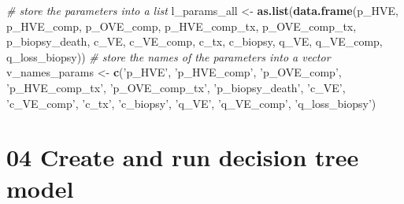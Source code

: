 \documentclass[
]{article}
\newenvironment{Shaded}{\begin{snugshade}}{\end{snugshade}}
\newcommand{\CommentTok}[1]{\textcolor[rgb]{0.56,0.35,0.01}{\textit{#1}}}
\newcommand{\KeywordTok}[1]{\textcolor[rgb]{0.13,0.29,0.53}{\textbf{#1}}}
\newcommand{\NormalTok}[1]{#1}
\newcommand{\StringTok}[1]{\textcolor[rgb]{0.31,0.60,0.02}{#1}}
\begin{document}
\begin{Shaded}
\begin{Highlighting}[]
\CommentTok{# store the parameters into a list}
\NormalTok{l_params_all <-}\StringTok{ }\KeywordTok{as.list}\NormalTok{(}\KeywordTok{data.frame}\NormalTok{(p_HVE, p_HVE_comp, p_OVE_comp, p_HVE_comp_tx, p_OVE_comp_tx, p_biopsy_death, }
\NormalTok{                                   c_VE, c_VE_comp, c_tx, c_biopsy, }
\NormalTok{                                   q_VE, q_VE_comp, q_loss_biopsy))}
\CommentTok{# store the names of the parameters into a vector}
\NormalTok{v_names_params <-}\StringTok{ }\KeywordTok{c}\NormalTok{(}\StringTok{'p_HVE'}\NormalTok{, }\StringTok{'p_HVE_comp'}\NormalTok{, }\StringTok{'p_OVE_comp'}\NormalTok{, }\StringTok{'p_HVE_comp_tx'}\NormalTok{, }\StringTok{'p_OVE_comp_tx'}\NormalTok{, }\StringTok{'p_biopsy_death'}\NormalTok{, }
                    \StringTok{'c_VE'}\NormalTok{, }\StringTok{'c_VE_comp'}\NormalTok{,  }\StringTok{'c_tx'}\NormalTok{, }\StringTok{'c_biopsy'}\NormalTok{, }\StringTok{'q_VE'}\NormalTok{, }\StringTok{'q_VE_comp'}\NormalTok{, }\StringTok{'q_loss_biopsy'}\NormalTok{)}
\end{Highlighting}
\end{Shaded}

\hypertarget{create-and-run-decision-tree-model}{%
\section{04 Create and run decision tree
model}\label{create-and-run-decision-tree-model}}
\end{document}
